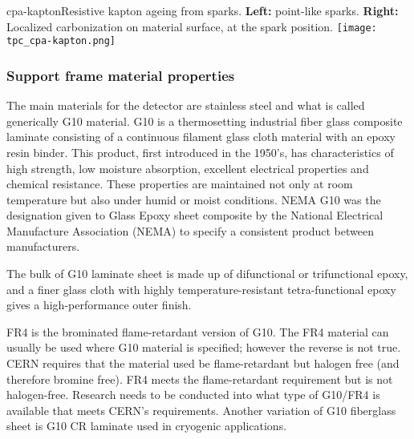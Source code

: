 \begin{cdrfigure}{cpa-kapton}{Resistive kapton ageing from sparks. 
 {\bf Left:} point-like sparks. {\bf Right:} Localized carbonization on material surface, at the spark position.}
\texttt{[image: tpc\_cpa-kapton.png]}
\end{cdrfigure}

\subsubsection{Support frame material properties}

The main materials for the detector are stainless steel and what is called generically G10 material.  G10 is a thermosetting industrial fiber glass composite laminate consisting of a continuous filament glass cloth material with an epoxy resin binder. This product, first introduced in the 1950's, has characteristics of high strength, low moisture absorption, excellent electrical properties  and chemical resistance. These properties are maintained not only at room temperature but also under humid or moist conditions. 
NEMA G10 was the designation given to Glass Epoxy sheet composite by the National Electrical Manufacture Association (NEMA) to specify a consistent product between manufacturers. 



The bulk of G10 laminate sheet is made up of difunctional or trifunctional epoxy, and a finer glass cloth with highly temperature-resistant tetra-functional epoxy gives a high-performance outer finish. 

FR4 is the brominated flame-retardant version of G10. The FR4 material can usually be used where G10 material is specified; however %
the reverse is not true. CERN requires that the material used be flame-retardant but halogen free (and therefore bromine free).  FR4 meets the flame-retardant requirement but %
is not halogen-free. Research needs to be conducted into what type of G10/FR4 is available that meets CERN's requirements.
Another variation of G10 fiberglass sheet is G10 CR laminate used in cryogenic applications. 

